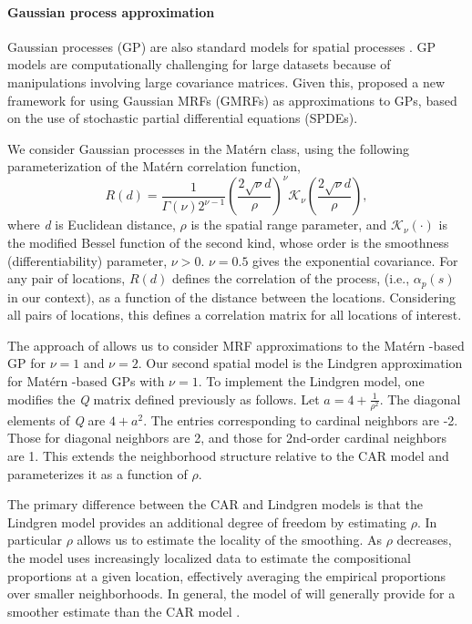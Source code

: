 \documentclass[10pt,letterpaper]{article}
\newcommand{\matern}{Mat\'{e}rn }
\begin{document}
\paragraph{Gaussian process approximation}

Gaussian processes (GP) are also standard models for spatial processes \cite{Bane:etal:2004}.
GP models are computationally challenging for large datasets because
of manipulations involving large covariance matrices. Given this,
\cite{Lind:etal:2011} proposed a new framework for using Gaussian
MRFs (GMRFs) as approximations to GPs, based on the use of stochastic
partial differential equations (SPDEs).

We consider Gaussian processes in the \matern class, using the following
parameterization of the \matern correlation function, 
\begin{equation}
R(d)=\frac{1}{\Gamma(\nu)2^{\nu-1}}\left(\frac{2\sqrt{\nu}d}{\rho}\right)^{\nu}\mathcal{K}_{\nu}\left(\frac{2\sqrt{\nu}d}{\rho}\right),
\end{equation}
where \emph{d} is Euclidean distance, $\rho$ is the spatial range parameter,
and $\mathcal{K}_{\nu}(\cdot)$ is the modified Bessel function of
the second kind, whose order is the smoothness (differentiability)
parameter, $\nu>0$. $\nu=0.5$ gives the exponential covariance.
For any pair of locations, $R(d)$ defines the correlation of the
process, (i.e., $\alpha_{p}(s)$ in our context), as a function of
the distance between the locations. Considering all pairs of locations,
this defines a correlation matrix for all locations of interest. 

The  approach of \cite{Lind:etal:2011} allows us to consider MRF approximations
to the \matern-based GP for $\nu=1$ and $\nu=2$. Our second spatial
model is the Lindgren approximation for \matern-based GPs with $\nu=1$.
To implement the Lindgren model, one modifies the \emph{Q} matrix defined
previously as follows. Let $a=4+\frac{1}{\rho^{2}}$. The diagonal
elements of \emph{Q} are $4+a^{2}$. The entries corresponding to cardinal
neighbors are -2. Those for diagonal neighbors are 2, and those
for 2nd-order cardinal neighbors are 1. This extends the neighborhood
structure relative to the CAR model and parameterizes it as a function
of $\rho$.

The primary difference between the CAR and Lindgren models is that
the Lindgren model provides an additional degree of freedom by estimating
$\rho$. In particular $\rho$ allows us to estimate the locality
of the smoothing. As $\rho$ decreases, the model uses increasingly
localized data to estimate the compositional proportions at a given
location, effectively averaging the empirical proportions over smaller
neighborhoods. In general, the model of \cite{Lind:etal:2011} will generally
provide for a smoother estimate than the CAR model \cite{Paci:2013}. 
\end{document}
